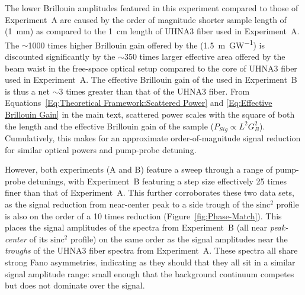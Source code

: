 The lower Brillouin amplitudes featured in this experiment compared to those of Experiment~A are caused by the order of magnitude shorter sample length of  (\SI{1}{\milli\meter}) as compared to the \SI{1}{\centi\meter} length of UHNA3 fiber used in Experiment~A. The \(\sim\)1000 times higher Brillouin gain offered by the  (\SI{1.5}{\meter\per\giga\watt}) is discounted significantly by the \(\sim\)350 times larger effective area offered by the beam waist in the free-space optical setup compared to the core of UHNA3 fiber used in Experiment~A. The effective Brillouin gain of the  used in Experiment~B is thus a net \(\sim\)3 times greater than that of the UHNA3 fiber. From Equations~\ref{Eq:Theoretical Framework:Scattered Power} and \ref{Eq:Effective Brillouin Gain} in the main text, scattered power scales with the square of both the length and the effective Brillouin gain of the sample (\(P_{Sig} \propto L^{2}G_{B}^{2}\)). Cumulatively, this makes for an approximate order-of-magnitude signal reduction for similar optical powers and pump-probe detuning.

However, both experiments (A and B) feature a sweep through a range of pump-probe detunings, with Experiment~B featuring a step size effectively 25 times finer than that of Experiment~A. This further corroborates these two data sets, as the signal reduction from near-center peak to a side trough of the \(\mathrm{sinc^{2}}\) profile is also on the order of a 10 times reduction (Figure~\ref{fig:Phase-Match}). This places the signal amplitudes of the  spectra from Experiment~B (all near \textit{peak-center} of its \(\mathrm{sinc^{2}}\) profile) on the same order as the signal amplitudes near the \textit{troughs} of the UHNA3 fiber spectra from Experiment~A. These spectra all share strong Fano asymmetries, indicating as they should that they all sit in a similar signal amplitude range: small enough that the background continuum competes but does not dominate over the signal. 

